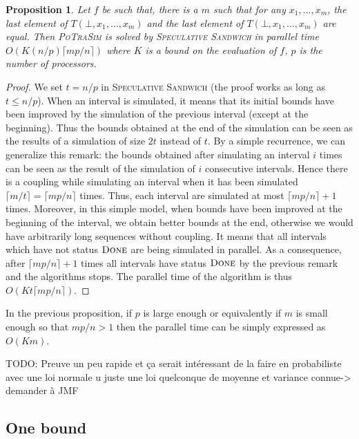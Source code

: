 \documentclass[a4paper,10pt]{article}
\newcommand{\todo}[1]{{\color{red} TODO: {#1}}}
\newtheorem{proposition}{Proposition}
\begin{document}
\begin{proposition}
 Let $f$ be such that, there is a $m$ such that for any $x_1,\dots,x_m$, the last element of
 $T(\bot,x_1,\dots,x_m)$ and the last element of $T(\bot,x_1,\dots,x_m)$ are equal. Then \textsc{PoTraSim} is solved by 
 \textsc{Speculative Sandwich} in parallel time $O(K(n/p)\lceil mp/n \rceil)$ where $K$ is a bound on the evaluation of $f$, $p$ is the number of processors.
\end{proposition}
\begin{proof}
We set $t = n/p$ in \textsc{Speculative Sandwich} (the proof works as long as $t \leq  n/p$). 
When an interval is simulated, it means that its initial bounds have been improved by the simulation of the previous interval
(except at the beginning). Thus the bounds obtained at the end of the simulation can be seen as the results of a simulation of size $2t$ instead of $t$.  By a simple recurrence, we can generalize this remark: the bounds obtained after simulating an interval $i$ times can be seen as the result of the simulation of $i$ consecutive intervals.  Hence there is a coupling while simulating an interval when it has been simulated $\lceil m/t \rceil = \lceil mp/n \rceil$ times. Thus, each interval are simulated at most $\lceil mp/n \rceil + 1$ times. Moreover, in this simple model, when bounds have been improved at the beginning of the interval, we obtain better bounds at the end, otherwise we would have arbitrarily long sequences without coupling. It means that all intervals which have not status $\textsc{Done}$ are being simulated in parallel. As a consequence, after $\lceil mp/n \rceil + 1$ times all intervals have status $\textsc{Done}$ by the previous remark and the algorithms stops. The parallel time of the algorithm is thus $O(Kt \lceil mp/n\rceil)$.
\end{proof}

In the previous proposition, if $p$ is large enough or equivalently if $m$ is small enough so that $mp/n > 1$ then 
the parallel time can be simply expressed as $O(Km)$.

\todo{Preuve un peu rapide et ça serait intéressant de la faire en probabiliste avec une loi normale u juste une loi quelconque de moyenne et variance connue-> demander à JMF}



\subsection{One bound}
\label{sec:onebound}
\end{document}
